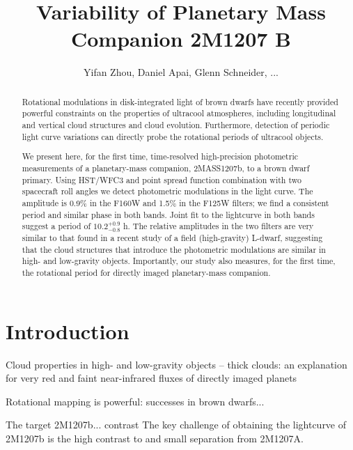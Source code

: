 \documentclass[apj]{emulateapj}
\begin{document}
\title{Variability of Planetary Mass Companion 2M1207 B}
\author{Yifan Zhou, Daniel Apai, Glenn Schneider, ...}

\begin{abstract} Rotational modulations in disk-integrated light of
brown dwarfs have recently provided powerful constraints on the
properties of ultracool atmospheres, including longitudinal and
vertical cloud structures and cloud evolution. Furthermore, detection
of periodic light curve variations can directly probe the rotational
periods of ultracool objects.

We present here, for the first time, time-resolved high-precision
photometric measurements of a planetary-mass companion, 2MASS1207b, to
a brown dwarf primary. Using HST/WFC3 and point spread function %
combination with two spacecraft roll angles we detect photometric
modulations in the light curve. The amplitude is 0.9\% in the F160W
and 1.5\% in the F125W filters; we find a consistent period and
similar phase in both bands. Joint fit to the lightcurve in both bands
suggest a period of $10.2^{+0.9}_{-0.8}$ h. The relative amplitudes in the two
filters are very similar to that found in a recent study of a field
(high-gravity) L-dwarf, suggesting that the cloud structures that
introduce the photometric modulations are similar in high- and
low-gravity objects. Importantly, our study also measures, for the
first time, the rotational period for directly imaged planetary-mass
companion.
\end{abstract}

\maketitle
%
\section{Introduction}

Cloud properties in high- and low-gravity objects -- thick clouds: an
explanation for very red and faint near-infrared fluxes of directly
imaged planets

Rotational mapping is powerful: successes in brown dwarfs...

The target 2M1207b... contrast The key challenge of obtaining the
lightcurve of 2M1207b is the high contrast to and small separation
from 2M1207A.
\end{document}
